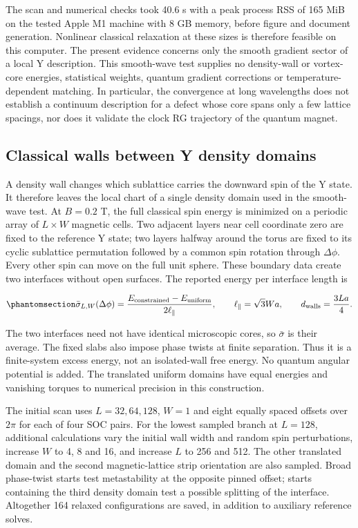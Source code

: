 The scan and numerical checks took 40.6 s with a peak process RSS of 165
MiB on the tested Apple M1 machine with 8 GB memory, before figure and
document generation. Nonlinear classical relaxation at these sizes is
therefore feasible on this computer. The present evidence concerns only
the smooth gradient sector of a local Y description. This smooth-wave
test supplies no density-wall or vortex-core energies, statistical
weights, quantum gradient corrections or temperature-dependent matching.
In particular, the convergence at long wavelengths does not establish a
continuum description for a defect whose core spans only a few lattice
spacings, nor does it validate the clock RG trajectory of the quantum
magnet.

\subsection{Classical walls between Y density
domains}\label{sec-nbcp-y-density-wall}

A density wall changes which sublattice carries the downward spin of the
Y state. It therefore leaves the local chart of a single density domain
used in the smooth-wave test. At \(B=0.2\) T, the full classical spin
energy is minimized on a periodic array of \(L\times W\) magnetic cells.
Two adjacent layers near cell coordinate zero are fixed to the reference
Y state; two layers halfway around the torus are fixed to its cyclic
sublattice permutation followed by a common spin rotation through
\(\Delta\phi\). Every other spin can move on the full unit sphere. These
boundary data create two interfaces without open surfaces. The reported
energy per interface length is

\begin{equation}\phantomsection\label{eq-nbcp-y-density-wall-energy}{
\bar\sigma_{L,W}(\Delta\phi)
=\frac{E_{\rm constrained}-E_{\rm uniform}}{2\ell_\parallel},
\qquad \ell_\parallel=\sqrt{3}Wa,
\qquad d_{\rm walls}=\frac{3La}{4}.
}\end{equation}

The two interfaces need not have identical microscopic cores, so
\(\bar\sigma\) is their average. The fixed slabs also impose phase
twists at finite separation. Thus it is a finite-system excess energy,
not an isolated-wall free energy. No quantum angular potential is added.
The translated uniform domains have equal energies and vanishing torques
to numerical precision in this construction.

The initial scan uses \(L=32,64,128\), \(W=1\) and eight equally spaced
offsets over \(2\pi\) for each of four SOC pairs. For the lowest sampled
branch at \(L=128\), additional calculations vary the initial wall width
and random spin perturbations, increase \(W\) to 4, 8 and 16, and
increase \(L\) to 256 and 512. The other translated domain and the
second magnetic-lattice strip orientation are also sampled. Broad
phase-twist starts test metastability at the opposite pinned offset;
starts containing the third density domain test a possible splitting of
the interface. Altogether 164 relaxed configurations are saved, in
addition to auxiliary reference solves.

